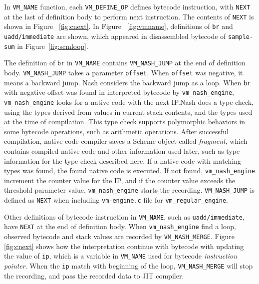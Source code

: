 \documentclass[preprint, numbers]{sigplanconf}
\begin{document}
In \texttt{VM\_NAME} function, each \texttt{VM\_DEFINE\_OP} defines bytecode
instruction, with \texttt{NEXT} at the last of definition body to perform next
instruction. The contents of \texttt{NEXT} is shown in Figure~
\hyperref[fig:cnext]{\ref{fig:cnext}}. In Figure~
\hyperref[fig:vmname]{\ref{fig:vmname}}, definitions of \texttt{br} and
\texttt{uadd/immediate} are shown, which appeared in disassembled bytecode of
\texttt{sample-sum} in Figure~\hyperref[fig:scmloop]{\ref{fig:scmloop}}.

The definition of \texttt{br} in \texttt{VM\_NAME} contains
\texttt{VM\_NASH\_JUMP} at the end of definition body. \texttt{VM\_NASH\_JUMP}
takes a parameter \texttt{offset}. When \texttt{offset} was negative, it means
a backward jump. Nash considers the backward jump as a loop. When \texttt{br}
with negative offset was found in interpreted bytecode by
\texttt{vm\_nash\_engine}, \texttt{vm\_nash\_engine} looks for a native code
with the next IP.\@ Nash does a type check, using the types derived from
values in current stack contents, and the types used at the time of
compilation. This type check supports polymorphic behaviors in some bytecode
operations, such as arithmetic operations. After successful compilation,
native code compiler saves a Scheme object called \textit{fragment}, which
contains compiled native code and other information used later, such as type
information for the type check described here. If a native code with matching
types was found, the found native code is executed. If not found,
\texttt{vm\_nash\_engine} increment the counter value for the IP, and if the
counter value exceeds the threshold parameter value, \texttt{vm\_nash\_engine}
starts the recording. \texttt{VM\_NASH\_JUMP} is defined as \texttt{NEXT} when
including \texttt{vm-engine.c} file for \texttt{vm\_regular\_engine}.

Other definitions of bytecode instruction in \texttt{VM\_NAME}, such as
\texttt{uadd/immediate}, have \texttt{NEXT} at the end of definition
body. When \texttt{vm\_nash\_engine} find a loop, observed bytecode and stack
values are recorded by \texttt{VM\_NASH\_MERGE}. Figure~
\hyperref[fig:cnext]{\ref{fig:cnext}} shows how the interpretation continue
with bytecode with updating the value of \texttt{ip}, which is a variable in
\texttt{VM\_NAME} used for bytecode \textit{instruction pointer}. When the
\texttt{ip} match with beginning of the loop, \texttt{VM\_NASH\_MERGE} will
stop the recording, and pass the recorded data to JIT compiler.
\end{document}
